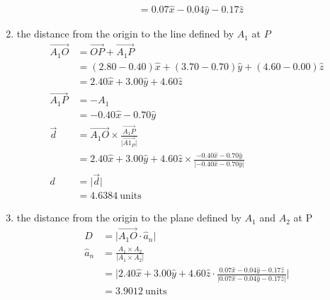 \documentclass[12pt]{article}
\begin{document}
\begin{enumerate}[label=\alph*)]
\[\begin{aligned}
        &= 0.07\hat{x} - 0.04\hat{y} - 0.17\hat{z}
    \end{aligned}
    \]
    \item the distance from the origin to the line defined by $A_1$ at $P$
    \[
    \begin{aligned}
        \overrightarrow{A_1O} &= \overrightarrow{OP} + \overrightarrow{A_1P} \\
        &= (2.80-0.40)\hat{x} + (3.70-0.70)\hat{y} + (4.60-0.00)\hat{z} \\
        &= 2.40\hat{x} + 3.00\hat{y} + 4.60\hat{z} \\
        \overrightarrow{A_1P} &= -A_1 \\
        &= -0.40\hat{x} - 0.70\hat{y} \\
        \overrightarrow{d} &= \overrightarrow{A_1O}\times\frac{\overrightarrow{A_1P}}{\lvert\overrightarrow{A1_P}\rvert} \\
        &= 2.40\hat{x}+3.00\hat{y}+4.60\hat{z}\times\frac{-0.40\hat{x}-0.70\hat{y}}{\lvert-0.40\hat{x}-0.70\hat{y}\rvert}\\
        d &= \lvert\overrightarrow{d}\rvert \\
        &= 4.6384 \ \text{units}
    \end{aligned}
    \]
    \item the distance from the origin to the plane defined by $A_1$ and $A_2$ at P
    \[
    \begin{aligned}
        D &= \lvert\overrightarrow{A_1O} \cdot \hat{a}_n \rvert \\
        \hat{a}_n &= \frac{A_1 \times A_2}{\lvert A_1 \times A_2\rvert} \\
        &= \lvert 2.40\hat{x} + 3.00\hat{y} + 4.60\hat{z} \cdot \frac{0.07\hat{x}-0.04\hat{y}-0.17\hat{z}}{\lvert 0.07\hat{x}-0.04\hat{y}-0.17\hat{z} \rvert}\rvert \\
        &= 3.9012 \ \text{units}
    \end{aligned}
    \]
\end{enumerate}
\end{document}
